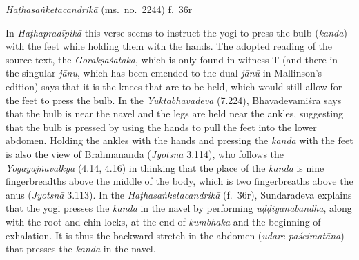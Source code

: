 \begin{ekdosis}
\begin{testimonia}[hp03_064]
\emph{Haṭhasaṅketacandrikā} (ms.~no.~2244) f.~36r
\begin{versinnote}
\end{versinnote}
\end{testimonia}

\begin{philcomm}[hp03_064]
In \emph{Haṭhapradīpikā} this verse seems to instruct the yogi to press the bulb (\emph{kanda}) with the feet while holding them with the hands. The adopted reading of the source text, the \emph{Gorakṣaśataka}, which is only found in witness T (and there in the singular \emph{jānu}, which has been emended to the dual \emph{jānū} in Mallinson's edition) says that it is the knees that are to be held, which would still allow for the feet to press the bulb. In the \emph{Yuktabhavadeva} (7.224), Bhavadevamiśra says that the bulb is near the navel and the legs are held near the ankles, suggesting that the bulb is pressed by using the hands to pull the feet into the lower abdomen. Holding the ankles with the hands and pressing the \emph{kanda} with the feet is also the view of Brahmānanda (\emph{Jyotsnā} 3.114), who follows the \emph{Yogayājñavalkya} (4.14, 4.16) in thinking that the place of the \emph{kanda} is nine fingerbreadths above the middle of the body, which is two fingerbreaths above the anus (\emph{Jyotsnā} 3.113). In the \emph{Haṭhasaṅketacandrikā} (f.~36r), Sundaradeva explains that the yogi presses the \emph{kanda} in the navel by performing \emph{uḍḍiyānabandha}, along with the root and chin locks, at the end of \emph{kumbhaka} and the beginning of exhalation. It is thus the backward stretch in the abdomen (\emph{udare paścimatāna}) that presses the \emph{kanda} in the navel.

\end{philcomm}



\end{ekdosis}
